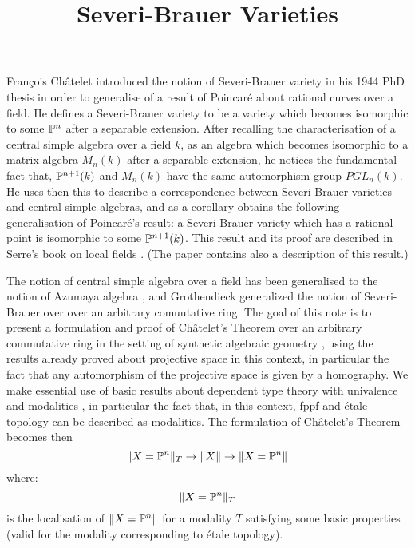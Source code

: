 \documentclass{../util/zariski}
\title{Severi-Brauer Varieties}
\begin{document}
\maketitle

{F}ran\c cois {C}h\^atelet introduced the notion of Severi-Brauer variety in his 1944 PhD thesis
\cite{chatelet44} in order to generalise of a result of Poincar\'e about rational curves over a field.
He defines a Severi-Brauer variety to be a variety which becomes isomorphic to some $\mathbb{P}^n$ after
a separable extension. After recalling the characterisation of a central simple algebra over a field $k$, as
an algebra which becomes isomorphic to a matrix algebra $M_n(k)$ after a separable extension, he notices the fundamental
fact that, $\mathbb{P}^{n+1}(k)$ and $M_n(k)$ have the same automorphism group $PGL_{n}(k)$. He uses then this
to describe a correspondence between Severi-Brauer varieties and central simple algebras, and as a corollary
obtains the following generalisation of Poincar\'e's result: a Severi-Brauer variety which has a rational point
is isomorphic to some $\mathbb{P}^{n+1}(k)$. This result and its proof are described in Serre's book on local fields \cite{serre62}.
(The paper \cite{colliot88} contains also a description of this result.)

The notion of central simple algebra over a field
has been generalised to the notion of Azumaya algebra  \cite{azumaya51}, and
Grothendieck \cite{grothendieck68} generalized the notion of Severi-Brauer over over an arbitrary comuutative ring.
The goal of this note is to present a formulation and proof of Ch\^atelet's Theorem over an arbitrary commutative ring
in the setting of synthetic algebraic geometry \cite{draft}, using the results already proved about projective
space \cite{sag-projective} in this context, in particular the fact that any automorphism of the projective space is given
by a homography. We make essential use of basic results about dependent type theory with univalence \cite{hott}
and modalities \cite{modalities}, in particular the fact that, in this context, fppf and \'etale topology can be described
as modalities. The formulation of Ch\^atelet's Theorem becomes then
\[\lVert X=\mathbb{P}^n \rVert_{T} \to \lVert X \rVert \to \lVert X=\mathbb{P}^n \rVert\]
where:
\[\lVert X=\mathbb{P}^n \rVert_{T}\]
is the localisation of $\lVert X=\mathbb{P}^n \rVert$ for a modality $T$ satisfying some basic properties (valid for the modality
corresponding to \'etale topology).

\end{document}
